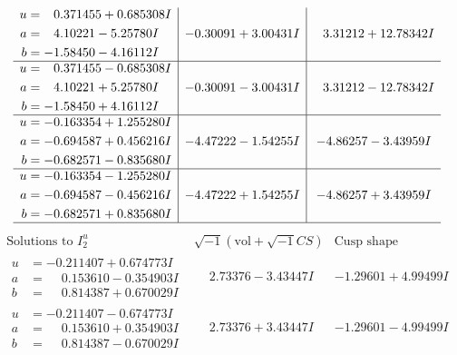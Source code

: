 \documentclass[1p]{elsarticle_modified}
\theoremstyle{definition}
\newcommand{\I}{\sqrt{-1}}
\begin{document}
$$\begin{array}{c|c|c}
\begin{aligned}
u &= \phantom{-}0.371455 + 0.685308 I \\
a &= \phantom{-}4.10221 - 5.25780 I \\
b &= -1.58450 - 4.16112 I\end{aligned}
 & -0.30091 + 3.00431 I & \phantom{-}3.31212 + 12.78342 I \\ \hline\begin{aligned}
u &= \phantom{-}0.371455 - 0.685308 I \\
a &= \phantom{-}4.10221 + 5.25780 I \\
b &= -1.58450 + 4.16112 I\end{aligned}
 & -0.30091 - 3.00431 I & \phantom{-}3.31212 - 12.78342 I \\ \hline\begin{aligned}
u &= -0.163354 + 1.255280 I \\
a &= -0.694587 + 0.456216 I \\
b &= -0.682571 - 0.835680 I\end{aligned}
 & -4.47222 - 1.54255 I & -4.86257 - 3.43959 I \\ \hline\begin{aligned}
u &= -0.163354 - 1.255280 I \\
a &= -0.694587 - 0.456216 I \\
b &= -0.682571 + 0.835680 I\end{aligned}
 & -4.47222 + 1.54255 I & -4.86257 + 3.43959 I\\
 \hline 
 \end{array}$$\newpage$$\begin{array}{c|c|c}  
\text{Solutions to }I^u_{2}& \I (\text{vol} + \sqrt{-1}CS) & \text{Cusp shape}\\
 \hline 
\begin{aligned}
u &= -0.211407 + 0.674773 I \\
a &= \phantom{-}0.153610 - 0.354903 I \\
b &= \phantom{-}0.814387 + 0.670029 I\end{aligned}
 & \phantom{-}2.73376 - 3.43447 I & -1.29601 + 4.99499 I \\ \hline\begin{aligned}
u &= -0.211407 - 0.674773 I \\
a &= \phantom{-}0.153610 + 0.354903 I \\
b &= \phantom{-}0.814387 - 0.670029 I\end{aligned}
 & \phantom{-}2.73376 + 3.43447 I & -1.29601 - 4.99499 I \\ \hline\begin{aligned}

\end{aligned}
\end{array}$$
\end{document}
